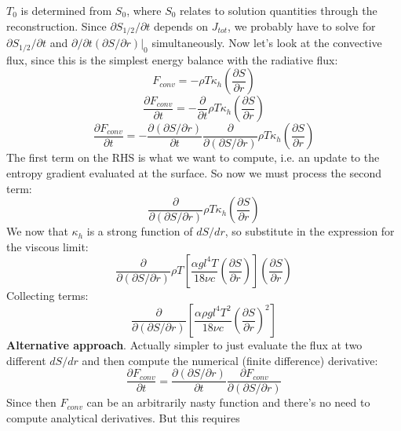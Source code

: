 $T_0$ is determined from $S_0$, where $S_0$ relates to solution quantities through the reconstruction.  Since $\partial S_{1/2} / \partial t$ depends on $J_{tot}$, we probably have to solve for $\partial S_{1/2} / \partial t$ and $\partial / \partial t (\partial S/\partial r)|_0$ simultaneously.  Now let's look at the convective flux, since this is the simplest energy balance with the radiative flux:
\begin{equation}
F_{conv} = -\rho T \kappa_h \left( \frac{\partial S}{\partial r} \right)
\end{equation}
\begin{equation}
\frac{\partial F_{conv}}{\partial t} = - \frac{\partial}{\partial t} \rho T \kappa_h \left( \frac{\partial S}{\partial r} \right)
\end{equation}
\begin{equation}
\frac{\partial F_{conv}}{\partial t} = -  \frac{\partial (\partial S/\partial r)}{\partial t} \frac{\partial}{\partial (\partial S/\partial r)} \rho T \kappa_h \left( \frac{\partial S}{\partial r} \right)
\end{equation}
The first term on the RHS is what we want to compute, i.e. an update to the entropy gradient evaluated at the surface.  So now we must process the second term:
\begin{equation}
\frac{\partial}{\partial (\partial S/\partial r)} \rho T \kappa_h \left( \frac{\partial S}{\partial r} \right)
\end{equation}
We now that $\kappa_h$ is a strong function of $dS/dr$, so substitute in the expression for the viscous limit:
\begin{equation}
\frac{\partial}{\partial (\partial S/\partial r)} \rho T \left[\frac{\alpha g l^4 T}{18 \nu c} \left( \frac{\partial S}{\partial r} \right) \right] \left( \frac{\partial S}{\partial r} \right)
\end{equation}
Collecting terms:
\begin{equation}
\frac{\partial}{\partial (\partial S/\partial r)} \left[\frac{\alpha \rho g l^4 T^2}{18 \nu c} \left( \frac{\partial S}{\partial r} \right)^2 \right]
\end{equation}
\textbf{Alternative approach}.  Actually simpler to just evaluate the flux at two different $dS/dr$ and then compute the numerical (finite difference) derivative:
\begin{equation}
\frac{\partial F_{conv}}{\partial t} = \frac{\partial (\partial S/\partial r)}{\partial t} \frac{\partial F_{conv}}{\partial (\partial S/\partial r)}
\end{equation}
Since then $F_{conv}$ can be an arbitrarily nasty function and there's no need to compute analytical derivatives.  But this requires 
